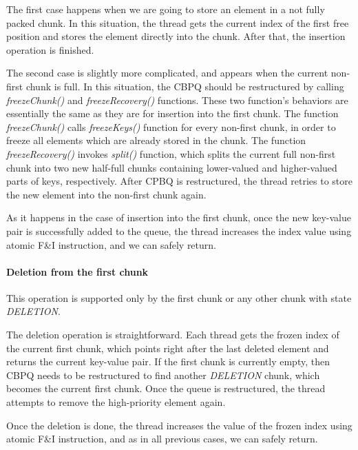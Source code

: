 \documentclass{article}
\begin{document}
  The first case happens when we are going to store an element in a not fully packed chunk. In this situation, the thread gets the current index of the first free position and stores the element directly into the chunk. After that, the insertion operation is finished.\par

  The second case is slightly more complicated, and appears when the current non-first chunk is full. In this situation, the CBPQ should be restructured by calling \textit{freezeChunk()} and \textit{freezeRecovery()} functions. These two function's behaviors are essentially the same as they are for insertion into the first chunk. The function \textit{freezeChunk()} calls \textit{freezeKeys()} function for every non-first chunk, in order to freeze all elements which are already stored in the chunk. The function \textit{freezeRecovery()} invokes \textit{split()} function, which splits the current full non-first chunk into two new half-full chunks containing lower-valued and higher-valued parts of keys, respectively. After CPBQ is restructured, the thread retries to store the new element into the non-first chunk again.\par

  As it happens in the case of insertion into the first chunk, once the new key-value pair is successfully added to the queue, the thread increases the index value using atomic F\&I instruction, and we can safely return.

  \paragraph{Deletion from the first chunk}\mbox{}\par
  This operation is supported only by the first chunk or any other chunk with state \emph{DELETION}.\par

  The deletion operation is straightforward. Each thread gets the frozen index of the current first chunk, which points right after the last deleted element and returns the current key-value pair. If the first chunk is currently empty, then CBPQ needs to be restructured to find another \emph{DELETION} chunk, which becomes the current first chunk. Once the queue is restructured, the thread attempts to remove the high-priority element again.\par

  Once the deletion is done, the thread increases the value of the frozen index using atomic F\&I instruction, and as in all previous cases, we can safely return.
\end{document}
